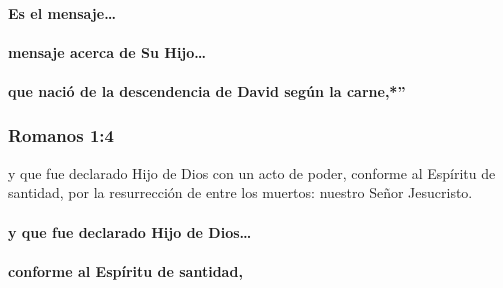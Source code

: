 \paragraph{Es el mensaje\ldots{}}\label{es-el-mensaje}

\paragraph{mensaje acerca de Su
Hijo\ldots{}}\label{mensaje-acerca-de-su-hijo}



\paragraph{que nació de la descendencia de David según la
carne,*''}\label{que-naciuxf3-de-la-descendencia-de-david-seguxfan-la-carne}



\subsubsection{Romanos 1:4}\label{romanos-14}

\begin{verseblock}
y que fue declarado Hijo de Dios con un acto de poder, conforme al Espíritu de santidad, por la resurrección de entre los muertos: nuestro Señor Jesucristo.
\end{verseblock}

\paragraph{y que fue declarado Hijo de
Dios\ldots{}}\label{y-que-fue-declarado-hijo-de-dios}



\paragraph{conforme al Espíritu de
santidad,}\label{conforme-al-espuxedritu-de-santidad}

